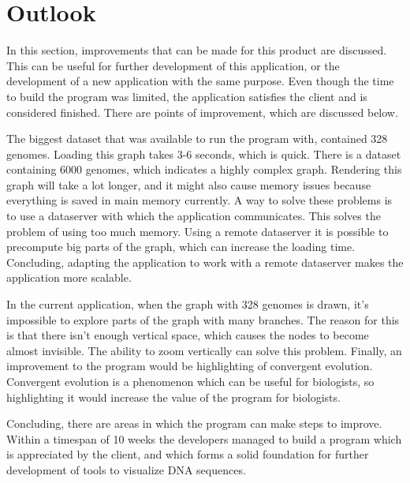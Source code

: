 \chapter{Outlook}
In this section, improvements that can be made for this product are discussed. This can be useful for further development of this application, or the development of a new application with the same purpose. Even though the time to build the program was limited, the application satisfies the client and is considered finished. There are points of improvement, which are discussed below.
\par
The biggest dataset that was available to run the program with, contained 328 genomes. Loading this graph takes 3-6 seconds, which is quick. There is a dataset containing 6000 genomes, which indicates a highly complex graph. Rendering this graph will take a lot longer, and it might also cause memory issues because everything is saved in main memory currently. A way to solve these problems is to use a dataserver with which the application communicates. This solves the problem of using too much memory. Using a remote dataserver it is possible to precompute big parts of the graph, which can increase the loading time. Concluding, adapting the application to work with a remote dataserver makes the application more scalable.
\par
In the current application, when the graph with 328 genomes is drawn, it’s impossible to explore parts of the graph with many branches. The reason for this is that there isn’t enough vertical space, which causes the nodes to become almost invisible. The ability to zoom vertically can solve this problem. 
Finally, an improvement to the program would be highlighting of convergent evolution. Convergent evolution is a phenomenon which can be useful for biologists, so highlighting it would increase the value of the program for biologists.
\par
Concluding, there are areas in which the program can make steps to improve. Within a timespan of 10 weeks the developers managed to build a program which is appreciated by the client, and which forms a solid foundation for further development of tools to visualize DNA sequences. 
